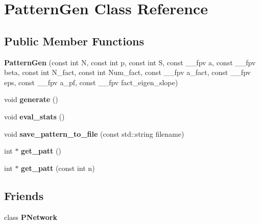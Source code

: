 \hypertarget{class_pattern_gen}{}\section{Pattern\+Gen Class Reference}
\label{class_pattern_gen}
\subsection*{Public Member Functions}
\begin{DoxyCompactItemize}
\item 
\hypertarget{class_pattern_gen_ae347681b782de3d3b415f5e0212c687c}{}{\bfseries Pattern\+Gen} (const int N, const int p, const int S, const \+\_\+\+\_\+fpv a, const \+\_\+\+\_\+fpv beta, const int N\+\_\+fact, const int Num\+\_\+fact, const \+\_\+\+\_\+fpv a\+\_\+fact, const \+\_\+\+\_\+fpv eps, const \+\_\+\+\_\+fpv a\+\_\+pf, const \+\_\+\+\_\+fpv fact\+\_\+eigen\+\_\+slope)\label{class_pattern_gen_ae347681b782de3d3b415f5e0212c687c}

\item 
\hypertarget{class_pattern_gen_a1e77dc569b771ee5185f51c7ca900e1a}{}void {\bfseries generate} ()\label{class_pattern_gen_a1e77dc569b771ee5185f51c7ca900e1a}

\item 
\hypertarget{class_pattern_gen_ace5ff5d0cb3ccc4b8b4941a22096dbc2}{}void {\bfseries eval\+\_\+stats} ()\label{class_pattern_gen_ace5ff5d0cb3ccc4b8b4941a22096dbc2}

\item 
\hypertarget{class_pattern_gen_ae33872117e255a8db86ea50d1a9cb413}{}void {\bfseries save\+\_\+pattern\+\_\+to\+\_\+file} (const std\+::string filename)\label{class_pattern_gen_ae33872117e255a8db86ea50d1a9cb413}

\item 
\hypertarget{class_pattern_gen_a4c3e875c5a117b4fd3de9a83bc396df8}{}int $\ast$ {\bfseries get\+\_\+patt} ()\label{class_pattern_gen_a4c3e875c5a117b4fd3de9a83bc396df8}

\item 
\hypertarget{class_pattern_gen_aaceb7c87b9efea67ba77ca78e2352bae}{}int $\ast$ {\bfseries get\+\_\+patt} (const int n)\label{class_pattern_gen_aaceb7c87b9efea67ba77ca78e2352bae}

\end{DoxyCompactItemize}
\subsection*{Friends}
\begin{DoxyCompactItemize}
\item 
\hypertarget{class_pattern_gen_af18c1bfc19f67a8a280667eb030fb0d2}{}class {\bfseries P\+Network}\label{class_pattern_gen_af18c1bfc19f67a8a280667eb030fb0d2}

\end{DoxyCompactItemize}


